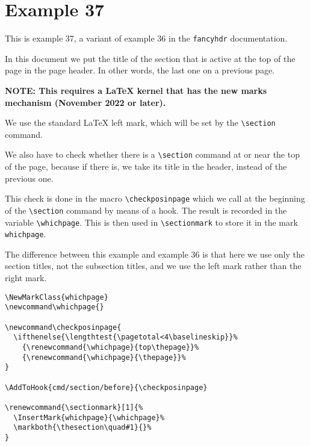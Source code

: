 \documentclass{article}
\newcommand\whichpage{}
\newcounter{thispage}
\newcommand\checkposinpage{
  \ifthenelse{\lengthtest{\pagetotal<4\baselineskip}}%
    {\renewcommand{\whichpage}{top\thepage}}%
    {\renewcommand{\whichpage}{\thepage}}%
  \setcounter{thispage}{\thepage}%
}
\renewcommand{\sectionmark}[1]{%
  \InsertMark{whichpage}{\whichpage}%
  \markboth{\thesection\quad#1}{}%
}
\begin{document}
\section*{Example 37}

\noindent
\begin{boxedminipage}{\textwidth}
This is example 37, a variant of example 36 in the \texttt{fancyhdr} documentation.

In this document we put the title of the section that is active at the top of the page in the page header. In other words, the last one on a previous page.

\textbf{NOTE: This requires a \LaTeX{} kernel that has the new marks mechanism (November 2022 or later).}

We use the standard \LaTeX{} left mark, which will be set by the \verb|\section| command.

We also have to check whether there is a \verb|\section| command at or near the top of the page, because if there is, we take its title in the header, instead of the previous one.

This check is done in the macro \verb|\checkposinpage| which we call at the beginning of the \verb|\section| command by means of a hook. The result is recorded in the variable \verb|\whichpage|. This is then used in \verb|\sectionmark| to store it in the mark \texttt{whichpage}.

The difference between this example and example 36 is that here we use only the section titles, not the subsection titles, and we use the left mark rather than the right mark.

\begin{verbatim}
\NewMarkClass{whichpage}
\newcommand\whichpage{}

\newcommand\checkposinpage{
  \ifthenelse{\lengthtest{\pagetotal<4\baselineskip}}%
    {\renewcommand{\whichpage}{top\thepage}}%
    {\renewcommand{\whichpage}{\thepage}}%
}

\AddToHook{cmd/section/before}{\checkposinpage}

\renewcommand{\sectionmark}[1]{%
  \InsertMark{whichpage}{\whichpage}%
  \markboth{\thesection\quad#1}{}%
}
\end{verbatim}
\end{boxedminipage}
\end{document}
